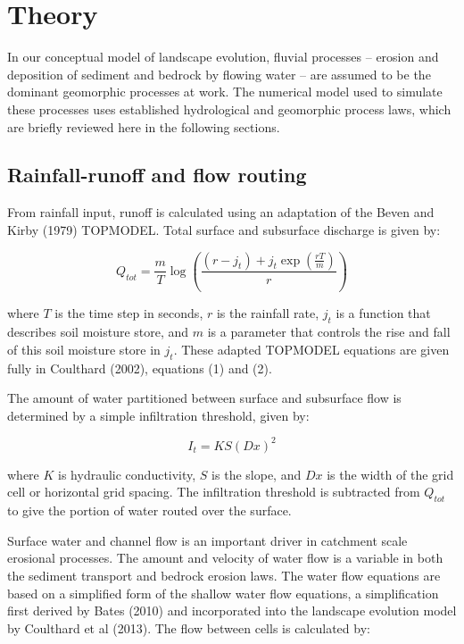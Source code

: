 \section{Theory}
In our conceptual model of landscape evolution, fluvial processes -- erosion and deposition of sediment and bedrock by flowing water -- are assumed to be the dominant geomorphic processes at work. The numerical model used to simulate these processes uses established hydrological and geomorphic process laws, which are briefly reviewed here in the following sections.

\subsection{Rainfall-runoff and flow routing}
From rainfall input, runoff is calculated using an adaptation of the Beven and Kirby (1979) TOPMODEL. Total surface and subsurface discharge is given by:

\begin{equation}
Q_{tot} = \frac{m}{T}\log \left( \frac{(r - j_t) + j_t \exp \left( \frac{rT}{m} \right) }{r} \right)
\end{equation}

where \(T\) is the time step in seconds, \(r\) is the rainfall rate, \(j_t\) is a function that describes soil moisture store, and \(m\) is a parameter that controls the rise and fall of this soil moisture store in \(j_t\). These adapted TOPMODEL equations are given fully in Coulthard (2002), equations (1) and (2).

The amount of water partitioned between surface and subsurface flow is determined by a simple infiltration threshold, given by:

\begin{equation}
I_t = KS(Dx)^2
\end{equation}

where \(K\) is hydraulic conductivity, \(S\) is the slope, and \(Dx\) is the width of the grid cell or horizontal grid spacing. The infiltration threshold is subtracted from \(Q_{tot}\) to give the portion of water routed over the surface.

Surface water and channel flow is an important driver in catchment scale erosional processes. The amount and velocity of water flow is a variable in both the sediment transport and bedrock erosion laws. The water flow equations are based on a simplified form of the shallow water flow equations, a simplification first derived by Bates (2010) and incorporated into the landscape evolution model by Coulthard et al (2013). The flow between cells is calculated by:

